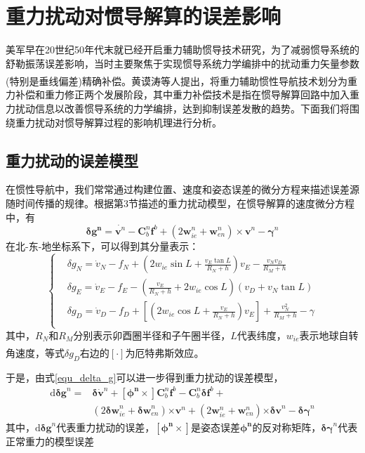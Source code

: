 \documentclass[12pt,a4,utf8]{article}
\newcommand{\upcite}[1]{\textsuperscript{\textsuperscript{\cite{#1}}}} %
\begin{document}
\section{重力扰动对惯导解算的误差影响}
美军早在20世纪50年代末就已经开启重力辅助惯导技术研究，为了减弱惯导系统的舒勒振荡误差影响，当时主要聚焦于实现惯导系统力学编排中的扰动重力矢量参数(特别是垂线偏差)精确补偿。黄谟涛等人提出\upcite{WHCH20240724001}，将重力辅助惯性导航技术划分为重力补偿和重力修正两个发展阶段，其中重力补偿技术是指在惯导解算回路中加入重力扰动信息以改善惯导系统的力学编排，达到抑制误差发散的趋势。下面我们将围绕重力扰动对惯导解算过程的影响机理进行分析。

\subsection{重力扰动的误差模型}
在惯性导航中，我们常常通过构建位置、速度和姿态误差的微分方程来描述误差源随时间传播的规律。根据第3节描述的重力扰动模型，在惯导解算的速度微分方程中，有
\begin{equation}
      \bm{\delta g^n} = \dot{\bm{v}^n}-\bm{C}^n_b\bm{f}^b+(2\bm{w}^n_{ie}+\bm{w}^n_{en})\times \bm{v}^n- \bm{\gamma}^n
      \label{equ_delta_g}
\end{equation}
在北-东-地坐标系下，可以得到其分量表示：
\begin{equation}
      \left\{ \begin{aligned}
      & \delta {{g}_{N}}={{{\dot{v}}}_{N}}-{{f}_{N}}+(2{{w}_{ie}}\sin L+\frac{{{v}_{E}}\tan L}{{{R}_{N}}+h}){{v}_{E}}-\frac{{{v}_{N}}{{v}_{D}}}{{{R}_{M}}+h} \\ 
      & \delta {{g}_{E}}={{{\dot{v}}}_{E}}-{{f}_{E}}-(\frac{{{v}_{E}}}{{{R}_{N}}+h}+2{{w}_{ie}}\cos L)({{v}_{D}}+{{v}_{N}}\tan L) \\ 
      & \delta {{g}_{D}}={{{\dot{v}}}_{D}}-{{f}_{D}}+\left[(2{{w}_{ie}}\cos L+\frac{{{v}_{E}}}{{{R}_{N}}+h}){{v}_{E}} \right]+\frac{v_{N}^{2}}{{{R}_{M}}+h}-\gamma  \\ 
\end{aligned} \right.
\label{equ_delta_g_more}
\end{equation}
其中，$R_N$和$R_M$分别表示卯酉圈半径和子午圈半径，$L$代表纬度，$w_{ie}$表示地球自转角速度，等式$\delta g_D$右边的$\left[ \cdot  \right]$为厄特弗斯效应\upcite{harlan1968eotvos}。

于是，由式\ref{equ_delta_g}可以进一步得到重力扰动的误差模型，
\begin{equation}
      \begin{aligned}
      \text{d}\bm{\delta g}^n = &\bm{\delta} \dot{\bm{v}}^n + \bm{[\phi^n\times]}\bm{C}^n_b \bm{f}^b - \bm{C}^n_b \bm{\delta f}^b + 
      \\
      &(2\bm{\delta w}^n_{ie} +\bm{\delta w}^n_{en})\bm{\times v}^n+(2\bm{w}^n_{ie} + \bm{w}^n_{en})\bm{\times \delta v}^n - \bm{\delta \gamma}^n
      \end{aligned}
      \label{equ_diff_disturb}
\end{equation}
其中，$\text{d}\bm{\delta g}^n$代表重力扰动的误差，$\bm{[\phi^n \times]}$是姿态误差$\bm{\phi^n}$的反对称矩阵，$\bm{\delta \gamma}^n$代表正常重力的模型误差
\end{document}
